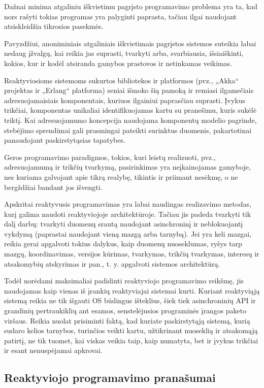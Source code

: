 Dažnai minima atgaliniu iškvietimu pagrįsto programavimo problema yra ta, kad nors rašyti tokias programas yra palyginti paprasta, tačiau ilgai naudojant atsiskleidžia tikrosios pasekmės.

Pavyzdžiui, anoniminiais atgaliniais iškvietimais pagrįstos sistemos suteikia labai nedaug įžvalgų, kai reikia jas suprasti, tvarkyti arba, svarbiausia, išsiaiškinti, kokios, kur ir kodėl atsiranda gamybos prastovos ir netinkamas veikimas.

Reaktyviosioms sistemoms sukurtos bibliotekos ir platformos (pvz., „Akka“ projektas ir „Erlang“ platforma) seniai išmoko šią pamoką ir remiasi ilgamečiais adresuojamaisiais komponentais, kuriuos ilgainiui paprasčiau suprasti. Įvykus trikčiai, komponentas unikaliai identifikuojamas kartu su pranešimu, kuris sukėlė triktį. Kai adresuojamumo koncepcija naudojama komponentų modelio pagrinde, stebėjimo sprendimai gali prasmingai pateikti surinktus duomenis, pakartotinai panaudojant paskirstytąsias tapatybes.

Geros programavimo paradigmos, tokios, kuri leistų realizuoti, pvz., adresuojamumą ir trikčių tvarkymą, pasirinkimas yra neįkainojamas gamyboje, nes kuriama galvojant apie tikrą realybę, tikintis ir priimant nesėkmę, o ne bergždžiai bandant jos išvengti.

Apskritai reaktyvusis programavimas yra labai naudingas realizavimo metodas, kurį galima naudoti reaktyviojoje architektūroje. Tačiau jis padeda tvarkyti tik dalį darbų: tvarkyti duomenų srautą naudojant asinchroninį ir neblokuojantį vykdymą (paprastai naudojant vieną mazgą arba tarnybą). Jei yra keli mazgai, reikia gerai apgalvoti tokius dalykus, kaip duomenų nuoseklumas, ryšys tarp mazgų, koordinavimas, versijos kūrimas, tvarkymas, trikčių tvarkymas, interesų ir atsakomybių atskyrimas ir pan., t. y. apgalvoti sistemos architektūrą.

Todėl norėdami maksimaliai padidinti reaktyviojo programavimo reikšmę, jis naudojamas kaip vienas iš įrankių reaktyviajai sistemai kurti. Kuriant reaktyviąją sistemą reikia ne tik išgauti OS būdingus išteklius, šiek tiek asinchroninių API ir grandinių pertraukiklių ant esamos, senstelėjusios programinės įrangos paketo viršaus. Reikia nuolat prisiminti faktą, kad kuriate paskirstytąją sistemą, kurią sudaro kelios tarnybos, turinčios veikti kartu, užtikrinant nuoseklią ir atsakomąją patirtį, ne tik tuomet, kai viskas veikia taip, kaip numatyta, bet ir įvykus trikčiai ir esant nenuspėjamai apkrovai.

\subsection{Reaktyviojo programavimo pranašumai}


